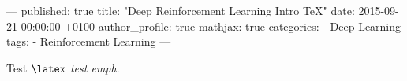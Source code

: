 ---
published: true
title: "Deep Reinforcement Learning Intro TeX"
date:   2015-09-21 00:00:00 +0100
author_profile: true
mathjax: true
categories:
  - Deep Learning
tags:
  - Reinforcement Learning
---

Test $\latex$ \emph{test emph}.
